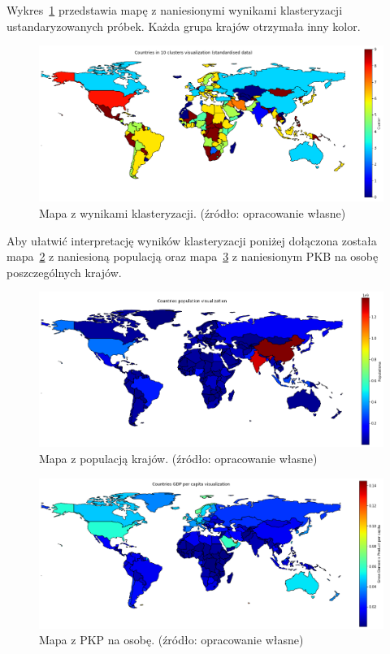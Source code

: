 \documentclass[11pt]{report}
\begin{document}
    Wykres~\ref{fig:clust10std} przedstawia mapę z naniesionymi wynikami klasteryzacji ustandaryzowanych próbek.
    Każda grupa krajów otrzymała inny kolor.

    \begin{figure}[ht!]
        \centering
        \includegraphics[width=1 \textwidth]{fig/CLUST/10clusterMap_std.png}
        \caption{Mapa z wynikami klasteryzacji. (źródło: opracowanie własne)}
        \label{fig:clust10std}
    \end{figure}

    Aby ułatwić interpretację wyników klasteryzacji poniżej dołączona została mapa~\ref{fig:clustPop} z naniesioną populacją oraz mapa~\ref{fig:clustGDP} z naniesionym PKB na osobę poszczególnych krajów.

    \begin{figure}[ht!]
        \centering
        \includegraphics[width=1 \textwidth]{fig/CLUST/population.png}
        \caption{Mapa z populacją krajów. (źródło: opracowanie własne)}
        \label{fig:clustPop}
    \end{figure}

    \begin{figure}[ht!]
        \centering
        \includegraphics[width=1 \textwidth]{fig/CLUST/gdp.png}
        \caption{Mapa z PKP na osobę. (źródło: opracowanie własne)}
        \label{fig:clustGDP}
    \end{figure}
\end{document}
